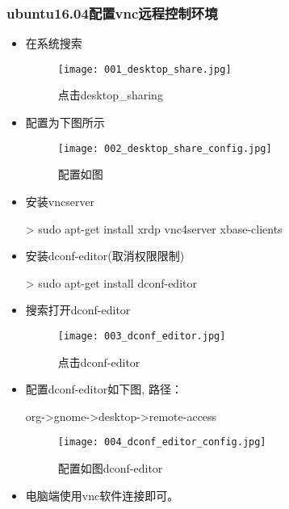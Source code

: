 \subsubsection{ubuntu16.04配置vnc远程控制环境}
\begin{itemize}
\item 在系统搜索
\begin{figure}[H]
\centering
\texttt{[image: 001\_desktop\_share.jpg]}
\caption{点击desktop\_sharing}
\end{figure}

\item 配置为下图所示
\begin{figure}[H]
\centering
\texttt{[image: 002\_desktop\_share\_config.jpg]}
\caption{配置如图}
\end{figure}

\item 安装vncserver
\begin{commandbox}
 > sudo apt-get install xrdp vnc4server xbase-clients
\end{commandbox}

\item 安装dconf-editor(取消权限限制)
\begin{commandbox}
 > sudo apt-get install dconf-editor
\end{commandbox}

\item 搜索打开dconf-editor
\begin{figure}[H]
\centering
\texttt{[image: 003\_dconf\_editor.jpg]}
\caption{点击dconf-editor}
\end{figure}

\item 配置dconf-editor如下图, 路径：
\begin{messagebox}
org->gnome->desktop->remote-access
\end{messagebox}

\begin{figure}[H]
\centering
\texttt{[image: 004\_dconf\_editor\_config.jpg]}
\caption{配置如图dconf-editor}
\end{figure}

\item 电脑端使用vnc软件连接即可。

\end{itemize}

